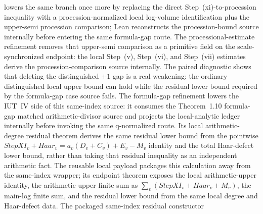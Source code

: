 \begin{proposition}
  lowers the same branch once more by replacing the direct Step~(xi)-to-procession
  inequality with a procession-normalized local log-volume identification plus
  the upper-semi procession comparison; Lean reconstructs the procession-bound
  source internally before entering the same formula-gap route.
  The processional-estimate refinement
  removes that upper-semi comparison as a primitive field on the
  scale-synchronized endpoint: the local Step~(v), Step~(vi), and Step~(vii)
  estimates derive the procession-comparison source internally.
  The paired diagnostic
  shows that deleting the distinguished \(+1\) gap is a real weakening: the
  ordinary distinguished local upper bound can hold while the residual
  lower bound required by the formula-gap case source fails.
  The formula-gap refinement
  lowers the IUT~IV side of this same-index source: it consumes the
  Theorem~1.10 formula-gap matched arithmetic-divisor source and projects the
  local-analytic ledger internally before invoking the same q-normalized
  route.  Its local arithmetic-degree residual theorem
  derives the same residual lower bound from the pointwise
  \(StepXI_v+Haar_v=a_v(D_v+C_v)+E_v-M_v\) identity and the total Haar-defect
  lower bound, rather than taking that residual inequality as an independent
  arithmetic fact.  The reusable local payload
  packages this calculation away from the same-index wrapper; its endpoint
  theorem exposes the local arithmetic-upper identity, the arithmetic-upper
  finite sum as \(\sum_v(StepXI_v+Haar_v+M_v)\), the main-log finite sum, and
  the residual lower bound from the same local degree and Haar-defect data.  The packaged same-index
  residual constructor

\end{proposition}
